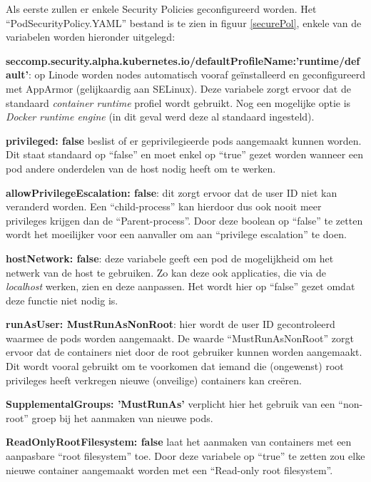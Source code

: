 Als eerste zullen er enkele Security Policies geconfigureerd worden. Het ``PodSecurityPolicy.YAML'' bestand is te zien in figuur \ref{securePol}, enkele van de variabelen worden hieronder uitgelegd: 


\textbf{seccomp.security.alpha.kubernetes.io/defaultProfileName:'runtime/default'}: op Linode worden nodes automatisch vooraf geïnstalleerd en geconfigureerd met AppArmor (gelijkaardig aan SELinux). Deze variabele zorgt ervoor dat de standaard \textit{container runtime} profiel wordt gebruikt. Nog een mogelijke optie is \textit{Docker runtime engine} (in dit geval werd deze al standaard ingesteld).

\textbf{privileged: false} beslist of er geprivilegieerde pods aangemaakt kunnen worden. Dit staat standaard op ``false'' en moet enkel op ``true'' gezet worden wanneer een pod andere onderdelen van de host nodig heeft om te werken. 

\textbf{allowPrivilegeEscalation: false}: dit zorgt ervoor dat de user ID niet kan veranderd worden. Een ``child-process'' kan hierdoor dus ook nooit meer privileges krijgen dan de ``Parent-process''. Door deze boolean op ``false'' te zetten wordt het moeilijker voor een aanvaller om aan ``privilege escalation'' te doen.

\textbf{hostNetwork: false}: deze variabele geeft een pod de mogelijkheid om het netwerk van de host te gebruiken. Zo kan deze ook applicaties, die via de \textit{localhost} werken, zien en deze aanpassen. Het wordt hier op ``false'' gezet omdat deze functie niet nodig is.

\textbf{runAsUser: MustRunAsNonRoot}: hier wordt de user ID gecontroleerd waarmee de pods worden aangemaakt. De waarde ``MustRunAsNonRoot'' zorgt ervoor dat de containers niet door de root gebruiker kunnen worden aangemaakt. Dit wordt vooral gebruikt om te voorkomen dat iemand die (ongewenst) root privileges heeft verkregen nieuwe (onveilige) containers kan creëren.

\textbf{SupplementalGroups: 'MustRunAs'} verplicht hier het gebruik van een ``non-root'' groep bij het aanmaken van nieuwe pods. 

\textbf{ReadOnlyRootFilesystem: false} laat het aanmaken van containers met een aanpasbare ``root filesystem'' toe. Door deze variabele op ``true'' te zetten zou elke nieuwe container aangemaakt worden met een ``Read-only root filesystem''.

